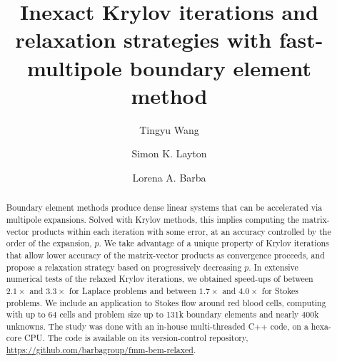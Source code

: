 \documentclass[final,3p,times]{elsarticle}
\begin{document}
\begin{frontmatter}



\title{Inexact Krylov iterations and relaxation strategies with fast-multipole boundary element method}


\author[gwu]{Tingyu Wang}

\author[bu,nvidia]{Simon K. Layton}

\author[gwu]{Lorena A. Barba}


\address[gwu]{Department of Mechanical and Aerospace Engineering, The George Washington University, Washington DC, 20052}
\address[bu]{Department of Mechanical Engineering, Boston University, Boston, MA, 02215}
\address[nvidia]{Nvidia, Corp., Santa Clara, CA}



\begin{abstract}
Boundary element methods produce dense linear systems that can be accelerated via multipole expansions. Solved with Krylov methods, this implies computing the matrix-vector products within each iteration with some error, at an accuracy controlled by the order of the expansion, $p$. We take advantage of a unique property of Krylov iterations that allow lower accuracy of the matrix-vector products as convergence proceeds, and propose a relaxation strategy based on progressively decreasing $p$. In extensive numerical tests of the relaxed Krylov iterations, we obtained speed-ups of between $2.1\times$ and $3.3\times$ for Laplace problems and between $1.7\times$ and $4.0\times$ for Stokes problems. We include an application to Stokes flow around red blood cells, computing with up to 64 cells and problem size up to 131k boundary elements and nearly 400k unknowns. The study was done with an in-house multi-threaded C++ code, on a hexa-core CPU. The code is available on its version-control repository, \href{https://github.com/barbagroup/fmm-bem-relaxed}{https://github.com/barbagroup/fmm-bem-relaxed}.
\end{abstract}


\end{frontmatter}
\end{document}
